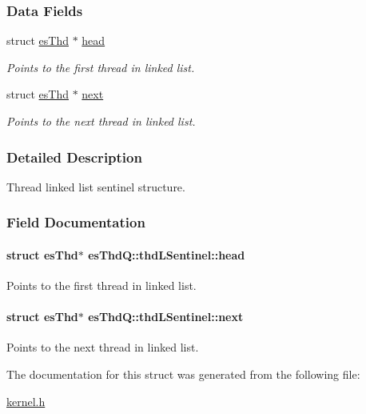 \subsubsection*{Data Fields}
\begin{DoxyCompactItemize}
\item 
struct \hyperlink{structesThd}{es\-Thd} $\ast$ \hyperlink{structesThdQ_1_1thdLSentinel_a0364b36e7510ebb5aff4ec311226380d}{head}
\begin{DoxyCompactList}\small\item\em Points to the first thread in linked list. \end{DoxyCompactList}\item 
struct \hyperlink{structesThd}{es\-Thd} $\ast$ \hyperlink{structesThdQ_1_1thdLSentinel_ada486993f56791fb654497229d5e84f1}{next}
\begin{DoxyCompactList}\small\item\em Points to the next thread in linked list. \end{DoxyCompactList}\end{DoxyCompactItemize}


\subsubsection{Detailed Description}
Thread linked list sentinel structure. 

\subsubsection{Field Documentation}
\hypertarget{structesThdQ_1_1thdLSentinel_a0364b36e7510ebb5aff4ec311226380d}{
\paragraph[{head}]{\setlength{\rightskip}{0pt plus 5cm}struct {\bf es\-Thd}$\ast$ es\-Thd\-Q\-::thd\-L\-Sentinel\-::head}}\label{structesThdQ_1_1thdLSentinel_a0364b36e7510ebb5aff4ec311226380d}


Points to the first thread in linked list. 

\hypertarget{structesThdQ_1_1thdLSentinel_ada486993f56791fb654497229d5e84f1}{
\paragraph[{next}]{\setlength{\rightskip}{0pt plus 5cm}struct {\bf es\-Thd}$\ast$ es\-Thd\-Q\-::thd\-L\-Sentinel\-::next}}\label{structesThdQ_1_1thdLSentinel_ada486993f56791fb654497229d5e84f1}


Points to the next thread in linked list. 



The documentation for this struct was generated from the following file\-:\begin{DoxyCompactItemize}
\item 
\hyperlink{kernel_8h}{kernel.\-h}\end{DoxyCompactItemize}
